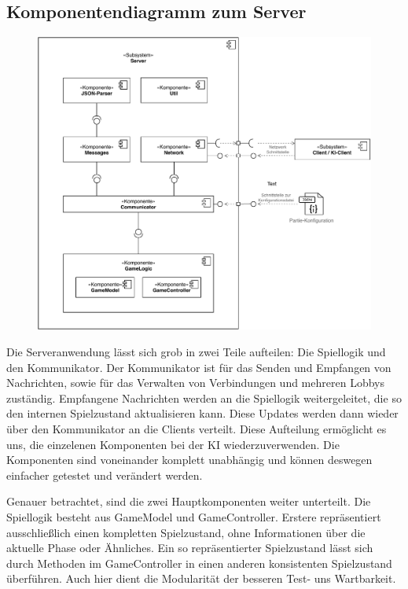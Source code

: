 \subsection{Komponentendiagramm zum Server}
\begin{figure}[H]
    \centering
    \includegraphics[scale=0.85]{../Endabnahme/images/ServerDiagramme.pdf}
\end{figure}
Die Serveranwendung lässt sich grob in zwei Teile aufteilen: Die Spiellogik und den Kommunikator. Der Kommunikator ist für das Senden und Empfangen von Nachrichten, sowie für das Verwalten von Verbindungen und mehreren Lobbys zuständig. Empfangene Nachrichten werden an die Spiellogik weitergeleitet, die so den internen Spielzustand aktualisieren kann. Diese Updates werden dann wieder über den Kommunikator an die Clients verteilt. Diese Aufteilung ermöglicht es uns, die einzelenen Komponenten bei der KI wiederzuverwenden. Die Komponenten sind voneinander komplett unabhängig und können deswegen einfacher getestet und verändert werden.

Genauer betrachtet, sind die zwei Hauptkomponenten weiter unterteilt. Die Spiellogik besteht aus GameModel und GameController. Erstere repräsentiert ausschließlich einen kompletten Spielzustand, ohne Informationen über die aktuelle Phase oder Ähnliches. Ein so repräsentierter Spielzustand lässt sich durch Methoden im GameController in einen anderen konsistenten Spielzustand überführen. Auch hier dient die Modularität der besseren Test- uns Wartbarkeit.

